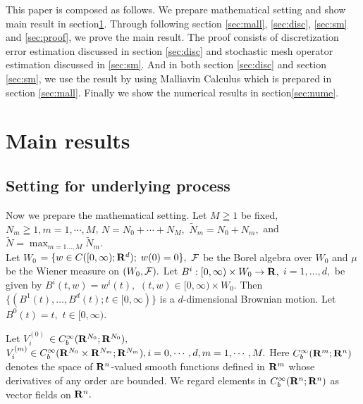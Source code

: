 \documentclass[12pt]{article}
\begin{document}
This paper is composed as follows.
We prepare mathematical setting and show main result in section\ref{sec:main}.
Through following section \ref{sec:mall}, \ref{sec:disc}, 
\ref{sec:sm} and \ref{sec:proof}, we prove the main result. 
The proof consists of 
discretization error estimation discussed in section \ref{sec:disc}
and stochastic mesh operator estimation discussed in \ref{sec:sm}.
And in both section \ref{sec:disc} and section \ref{sec:sm}, we use 
the result by using Malliavin Calculus which is prepared in section \ref{sec:mall}.
Finally we show the numerical results in section\ref{sec:nume}.


\section{Main results}\label{sec:main}
\subsection{Setting for underlying process}
Now we prepare the mathematical setting. 
Let $M \geqq 1$ be fixed, ${N}_{m} \geqq 1, m=1, \cdots, M$, 
$N= N_0+ \cdots + N_M,$ $ \tilde{N}_m=N_0+N_m,$ and $\tilde{N}=\max_{m=1\ldots,M}\tilde{N}_m$.\\
Let $W_0$ $ = \{ w\in C([0,\infty );{\bf R}^d); \; w(0) = 0 \} ,$
${\cal F}$ be the Borel algebra over $W_0$ 
and $\mu$ be the Wiener measure on $(W_0,{\cal F}).$
Let $B^i:[0,\infty )\times W_0 \to {\bf R},$ $i=1,\ldots ,d,$ be given 
by $B^i(t,w) =w^i(t),$ $(t,w)\in [0,\infty )\times W_0.$
Then $ \{ (B^1(t), \dots ,B^d(t) ; t \in [0,\infty ) \}$ 
is a $d$-dimensional Brownian motion.
Let $B^0(t) = t,$ $t \in [0,\infty ).$

\noindent Let $V^{(0)}_i$ $ \in C^{\infty}_b({\bf R}^{{N}_0}; {\bf R}^{{N}_0}),$ 
$V^{(m)}_i \in C^{\infty}_b({\bf R}^{{N}_0}\times {\bf R}^{{N}_m};{\bf R}^{{N}_m}), i =0, \cdots, d, m=1, \cdots, M.$
Here $C^{\infty}_b({\bf R}^m;{\bf R}^n)$ denotes 
the space of ${\bf R}^n$-valued smooth functions defined 
in ${\bf R}^m$ whose derivatives of any order are bounded.
We regard elements in $C^{\infty}_b({\bf R}^n;{\bf R}^n)$ 
as vector fields on ${\bf R}^n.$
\end{document}

